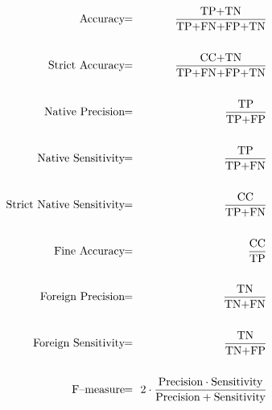 \documentclass{llncs}
\begin{document}
\begin{eqnarray}
            \textnormal{Accuracy} &\!\!=\!\!& \frac{\textnormal{TP+TN}}{\textnormal{TP+FN+FP+TN}}\nonumber\\\nonumber\\
     \textnormal{Strict Accuracy} &\!\!=\!\!& \frac{\textnormal{CC+TN}}{\textnormal{TP+FN+FP+TN}}\nonumber\\\nonumber\\
    \textnormal{Native Precision} &\!\!=\!\!& \frac{\textnormal{TP}}{\textnormal{TP+FP}}\nonumber\\\nonumber\\
  \textnormal{Native Sensitivity} &\!\!=\!\!& \frac{\textnormal{TP}}{\textnormal{TP+FN}}\nonumber\\\nonumber\\
  \textnormal{Strict Native Sensitivity} &\!\!=\!\!& \frac{\textnormal{CC}}{\textnormal{TP+FN}}\nonumber\\\nonumber\\
          \textnormal{Fine Accuracy} &\!\!=\!\!& \frac{\textnormal{CC}}{\textnormal{TP}}\nonumber\\\nonumber\\
   \textnormal{Foreign Precision} &\!\!=\!\!& \frac{\textnormal{TN}}{\textnormal{TN+FN}}\nonumber\\\nonumber\\
 \textnormal{Foreign Sensitivity} &\!\!=\!\!& \frac{\textnormal{TN}}{\textnormal{TN+FP}}\nonumber\\\nonumber\\
          \textnormal{F--measure} &\!\!=\!\!& 2\cdot\frac{\textnormal{Precision}\cdot\textnormal{Sensitivity}} {\textnormal{Precision}+\textnormal{Sensitivity}}\nonumber\\\nonumber
\end{eqnarray}
\end{document}
